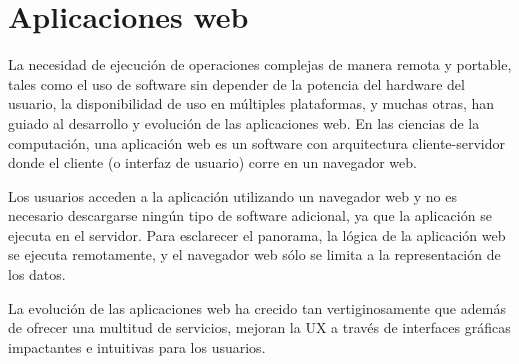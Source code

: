 \section{Aplicaciones web}
La necesidad de ejecución de operaciones complejas de manera remota y portable, tales como el uso de software sin depender de la potencia del hardware del usuario, la disponibilidad de uso en múltiples plataformas, y muchas otras, han guiado al desarrollo y evolución de las aplicaciones web. En las ciencias de la computación, una aplicación web es un software con arquitectura cliente-servidor donde el cliente (o interfaz de usuario) corre en un navegador web\citep{net_app_architecture}.

Los usuarios acceden a la aplicación utilizando un navegador web y no es necesario descargarse ningún tipo de software adicional, ya que la aplicación se ejecuta en el servidor. Para esclarecer el panorama, la lógica de la aplicación web se ejecuta remotamente, y el navegador web sólo se limita a la representación de los datos.

La evolución de las aplicaciones web ha crecido tan vertiginosamente que además de ofrecer una multitud de servicios, mejoran la UX a través de interfaces gráficas impactantes e intuitivas para los usuarios\citep{myers_past_2009}.